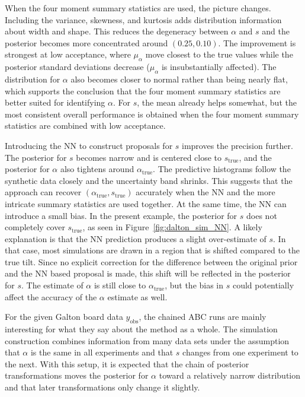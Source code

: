 \documentclass[a4paper, 12pt]{article}
\begin{document}
When the four moment summary statistics are used, the picture changes. Including the variance, skewness, and kurtosis adds distribution information about width and shape. This reduces the degeneracy between $\alpha$ and $s$ and the posterior becomes more concentrated around $(0.25, 0.10)$. The improvement is strongest at low acceptance, where $\mu_{\alpha}$ move closest to the true values while the posterior standard deviations decrease ($\mu_{\alpha}$ is insubstantially affected). The distribution for $\alpha$ also becomes closer to normal rather than being nearly flat, which supports the conclusion that the four moment summary statistics are better suited for identifying $\alpha$. For $s$, the mean already helps somewhat, but the most consistent overall performance is obtained when the four moment summary statistics are combined with low acceptance.

Introducing the NN to construct proposals for $s$ improves the precision further. The posterior for $s$ becomes narrow and is centered close to $s_\text{true}$, and the posterior for $\alpha$ also tightens around $\alpha_\text{true}$. The predictive histograms follow the synthetic data closely and the uncertainty band shrinks. This suggests that the approach can recover $(\alpha_\text{true}, s_\text{true})$ accurately when the NN and the more intricate summary statistics are used together. At the same time, the NN can introduce a small bias. In the present example, the posterior for $s$ does not completely cover $s_\text{true}$, as seen in Figure~\ref{fig:dalton_sim_NN}. A likely explanation is that the NN prediction produces a slight over-estimate of $s$. In that case, most simulations are drawn in a region that is shifted compared to the true tilt. Since no explicit correction for the difference between the original prior and the NN based proposal is made, this shift will be reflected in the posterior for $s$. The estimate of $\alpha$ is still close to $\alpha_\text{true}$, but the bias in $s$ could potentially affect the accuracy of the $\alpha$ estimate as well.

For the given Galton board data $y_\text{obs}$, the chained ABC runs are mainly interesting for what they say about the method as a whole. The simulation construction combines information from many data sets under the assumption that $\alpha$ is the same in all experiments and that $s$ changes from one experiment to the next. With this setup, it is expected that the chain of posterior transformations moves the posterior for $\alpha$ toward a relatively narrow distribution and that later transformations only change it slightly. 
\end{document}
